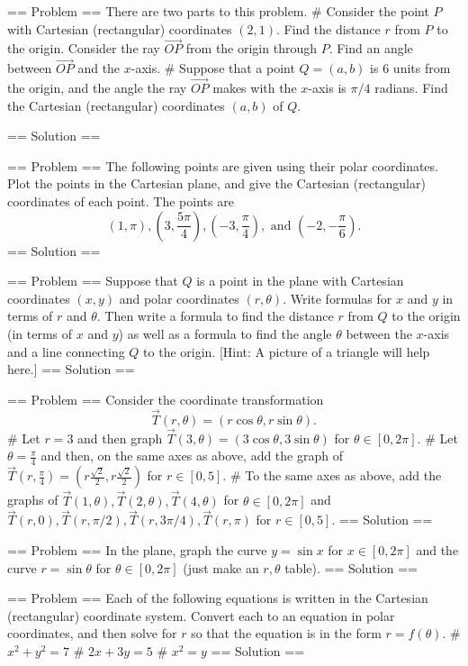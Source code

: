 

== Problem ==
There are two parts to this problem.
# Consider the point \(P\) with Cartesian (rectangular) coordinates \((2,1)\).  Find the distance \(r\) from \(P\) to the origin. Consider the ray \(\vec {OP}\) from the origin through \(P\). Find an angle between \(\vec{OP}\) and the \(x\)-axis. 
# Suppose that a point \(Q=(a,b)\) is 6 units from the origin, and the angle the ray \(\vec {OP}\) makes with the \(x\)-axis is \(\pi/4\) radians.  Find the Cartesian (rectangular) coordinates \((a,b)\) of \(Q\).
 
== Solution ==


== Problem ==
The following points are given using their polar coordinates.  Plot the points in the Cartesian plane, and give the Cartesian (rectangular) coordinates of each point. The points are
\[
(1,\pi), 
\displaystyle \left( 3,\frac{5\pi}{4}\right),
\displaystyle \left( -3,\frac{\pi}{4}\right),\text{ and }
\displaystyle \left( -2,-\frac{\pi}{6}\right).\]
== Solution ==


== Problem ==
Suppose that \(Q\) is a point in the plane with Cartesian coordinates \((x,y)\) and polar coordinates \((r,\theta)\).  Write formulas for \(x\) and \(y\) in terms of \(r\) and \(\theta\).  Then write a formula to find the distance \(r\) from \(Q\) to the origin (in terms of \(x\) and \(y\)) as well as a formula to find the angle \(\theta\) between the \(x\)-axis and a line connecting \(Q\) to the origin. [Hint: A picture of a triangle will help here.]
== Solution ==


== Problem ==
Consider the coordinate transformation \[\vec T(r,\theta) = (r\cos\theta,r\sin\theta).\] 
# Let \(r=3\) and then graph \(\vec T(3,\theta)=(3\cos\theta,3\sin\theta)\) for \(\theta\in[0,2\pi]\).
# Let \(\theta=\frac{\pi}{4}\) and then, on the same axes as above, add the graph of 
\(\vec T\left(r,\frac{\pi}{4}\right)=\left(r\frac{\sqrt 2}{2},r \frac{\sqrt 2}{2}\right)\) for \(r\in[0,5]\).
# To the same axes as above, add the graphs of 
\(\vec T(1,\theta), \vec T(2,\theta), \vec T(4,\theta)\)  for \(\theta\in[0,2\pi]\) and 
\(\vec T(r,0), \vec T(r,\pi/2), \vec T(r,3\pi/4), \vec T(r,\pi)\) for \(r\in[0,5]\). 
== Solution ==


== Problem == 
In the plane, graph the curve \(y=\sin x\) for \(x\in[0,2\pi]\) and the curve \(r=\sin\theta\) for \(\theta\in[0,2\pi]\) (just make an \(r,\theta\) table). 
== Solution ==

== Problem ==
Each of the following equations is written in the Cartesian (rectangular) coordinate system.  Convert each to an equation in polar coordinates, and then solve for \(r\) so that the equation is in the form \(r=f(\theta)\).
# \(x^2+y^2=7\)
# \(2x+3y=5\)
# \(x^2=y\)
== Solution ==

